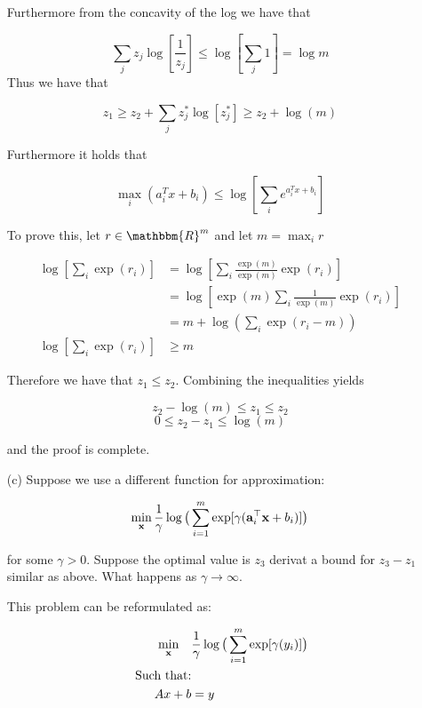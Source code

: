 \documentclass[answers]{exam} %
\newcommand{\R}{\mathbbm{R}}
\renewcommand\a{{\bf a}}
\newcommand\x{{\bf x}}
\renewcommand\a{{\bf a}}
\begin{document}
\begin{itemize}
\begin{framed}
Furthermore from the concavity of the log we have that 

\[
\sum_{j} z_j \log[\frac{1}{z_j}] \leq \log[\sum_{j} 1] = \log{m}
\]
Thus we have that 

\[
z_1 \geq z_2 + \sum_{j}z_j^{*} \log[z_j^*] \geq z_2 + \log(m)
\]

Furthermore it holds that 

\[
\max_{i}(a_i^T x + b_i) \leq \log[\sum_{i} e^{a_i^T x + b_i}]
\]

To prove this, let $r \in \R^m$ and let $m = \max_i r$

\begin{equation*}
\begin{aligned}
\log[\sum_{i} \exp(r_i)] &= \log[\sum_i \frac{\exp(m)}{\exp(m)} \exp(r_i)] \\ 
&= \log[ \exp(m) \sum_{i} \frac{1}{\exp(m)} \exp(r_i) ] \\ 
&= m + \log(\sum_i \exp(r_i - m) ) \\ 
\log[\sum_{i} \exp(r_i)]  &\geq m
\end{aligned}
\end{equation*}

Therefore we have that $z_1 \leq z_2$. Combining the inequalities yields

\[
z_2 - \log(m) \leq z_1 \leq z_2
\]
\[
0 \leq z_2 - z_1 \leq \log(m)
\]

and the proof is complete. 
\end{framed}
\item[(c)]  Suppose we use a different function for approximation:

\begin{framed}
\[
\min_{\x} \frac{1}{\gamma} \log \big(  \sum_{i=1}^{m} \exp[\gamma(\a_i^{\top} \x +  b_i)] \big)
\]

for some $\gamma > 0$. Suppose the optimal value is $z_3$ derivat a bound for $z_3 - z_1$ similar as above. What happens as $\gamma \to \infty$. 



This problem can be reformulated as:

\begin{equation*}
\begin{aligned}
\min_{\x} \quad &\frac{1}{\gamma} \log \big(  \sum_{i=1}^{m} \exp[\gamma(y_i)] \big) \\ 
\mbox{ Such that:} & \\ 
Ax + b &= y
\end{aligned}
\end{equation*}


\end{framed}
\end{itemize}
\end{document}
